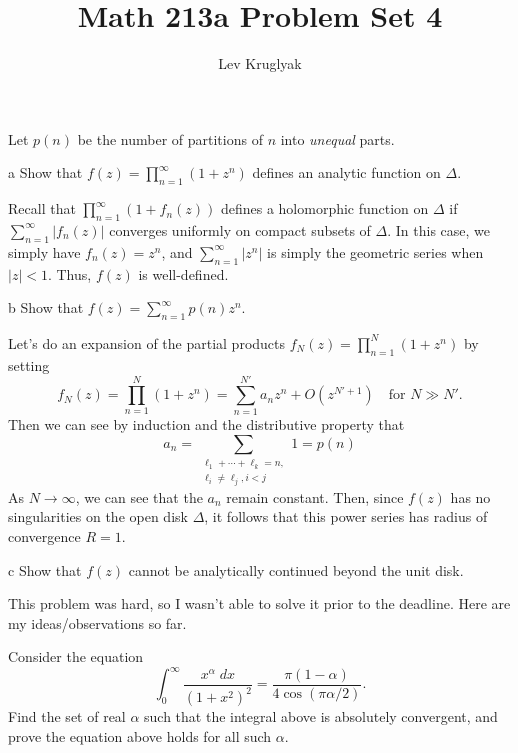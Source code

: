 \documentclass{pset}
\title{Math 213a Problem Set 4}
\author{Lev Kruglyak}
\begin{document}
\maketitle

\begin{problem}{18}
  Let $p(n)$ be the number of partitions of $n$ into \emph{unequal} parts.
\end{problem}

\begin{parts}
  \begin{part}{a}
    Show that $f(z)=\prod^\infty_{n=1}(1+z^n)$ defines an analytic function on $\Delta$.
  \end{part}

  Recall that $\prod^\infty_{n=1}(1+f_n(z))$ defines a holomorphic function on $\Delta$ if $\sum^\infty_{n=1} |f_n(z)|$ converges uniformly on compact subsets of $\Delta$. In this case, we simply have $f_n(z)=z^n$, and $\sum^\infty_{n=1} |z^n|$ is simply the geometric series when $|z|<1$. Thus, $f(z)$ is well-defined.

  \begin{part}{b}
    Show that $f(z)=\sum^\infty_{n=1}p(n)z^n$.
  \end{part}

  Let's do an expansion of the partial products $f_N(z) = \prod^N_{n=1}(1+z^n)$ by setting
  \[ f_N(z) = \prod^N_{n=1}(1+z^n) = \sum^{N'}_{n=1} a_nz^n + O(z^{N'+1})\quad\textrm{for } N \gg N'.\]
  Then we can see by induction and the distributive property that
  \[a_n = \sum_{\substack{\ell_1+\cdots+\ell_k = n,\\ \ell_i\neq \ell_j, i<j}} 1 = p(n)\]
  As $N \to \infty$, we can see that the $a_n$ remain constant. Then, since $f(z)$ has no singularities on the open disk $\Delta$, it follows that this power series has radius of convergence $R=1$.
 
  \begin{part}{c}
    Show that $f(z)$ cannot be analytically continued beyond the unit disk.
  \end{part}

  This problem was hard, so I wasn't able to solve it prior to the deadline. Here are my ideas/observations so far.
\end{parts}

\begin{problem}{23}
  Consider the equation
  \[
    \int^\infty_0 \frac{x^\alpha \;dx}{(1+x^2)^2} = \frac{\pi(1-\alpha)}{4\cos(\pi \alpha / 2)}.
  \]
  Find the set of real $\alpha$ such that the integral above is absolutely convergent, and prove the equation above holds for all such $\alpha$. 
\end{problem}
\end{document}
